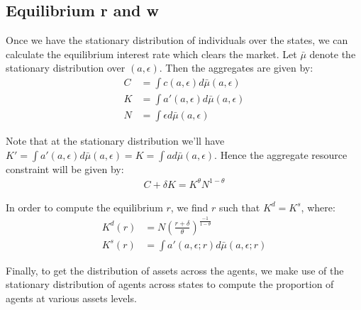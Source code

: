 \documentclass[12pt]{article}
\begin{document}
\subsection{Equilibrium r and w}
Once we have the stationary distribution of individuals over the states, we can calculate the equilibrium interest rate which clears the market. Let $\bar{\mu}$ denote the stationary distribution over $(a, \epsilon)$. Then the aggregates are given by:
\begin{align*}
C & = \int c(a, \epsilon)d\bar{\mu}(a, \epsilon) \\
K & = \int a'(a, \epsilon)d\bar{\mu}(a, \epsilon) \\
N & = \int \epsilon d\bar{\mu}(a, \epsilon)
\end{align*}

Note that at the stationary distribution we'll have $K' = \int a'(a, \epsilon)d\bar{\mu}(a, \epsilon) =  K = \int a d\bar{\mu}(a, \epsilon)$. Hence the aggregate resource constraint will be given by:
\begin{align*}
C + \delta K =  K^{\theta}N^{1-\theta} 
\end{align*}

In order to compute the equilibrium $r$, we find $r$ such that $K^d = K^s$, where:
\begin{align*}
K^d(r) & = N(\frac{r+\delta}{\theta})^{\frac{-1}{1-\theta}} \\
K^s(r) & = \int a'(a, \epsilon; r)d\bar{\mu}(a, \epsilon; r) 
\end{align*}

Finally, to get the distribution of assets across the agents, we make use of the stationary distribution of agents across states to compute the proportion of agents at various assets levels.
\end{document}
